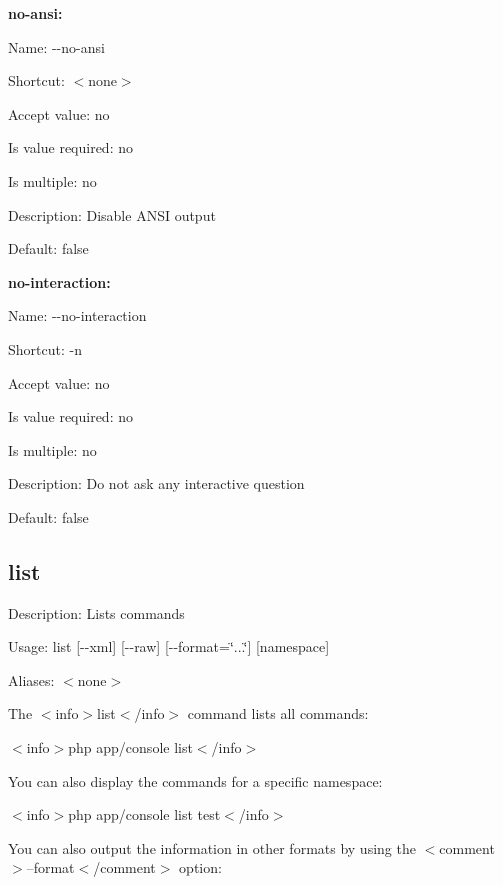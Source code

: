 {\bfseries no-\/ansi\+:}


\begin{DoxyItemize}
\item Name\+: {\ttfamily -\/-\/no-\/ansi}
\item Shortcut\+: $<$none$>$
\item Accept value\+: no
\item Is value required\+: no
\item Is multiple\+: no
\item Description\+: Disable A\+N\+S\+I output
\item Default\+: {\ttfamily false}
\end{DoxyItemize}

{\bfseries no-\/interaction\+:}


\begin{DoxyItemize}
\item Name\+: {\ttfamily -\/-\/no-\/interaction}
\item Shortcut\+: {\ttfamily -\/n}
\item Accept value\+: no
\item Is value required\+: no
\item Is multiple\+: no
\item Description\+: Do not ask any interactive question
\item Default\+: {\ttfamily false}
\end{DoxyItemize}

\subsection*{list }


\begin{DoxyItemize}
\item Description\+: Lists commands
\item Usage\+: {\ttfamily list [-\/-\/xml] [-\/-\/raw] [-\/-\/format=\char`\"{}...\char`\"{}] [namespace]}
\item Aliases\+: $<$none$>$
\end{DoxyItemize}

The $<$info$>$list$<$/info$>$ command lists all commands\+:

$<$info$>$php app/console list$<$/info$>$

You can also display the commands for a specific namespace\+:

$<$info$>$php app/console list test$<$/info$>$

You can also output the information in other formats by using the $<$comment$>$--format$<$/comment$>$ option\+:

